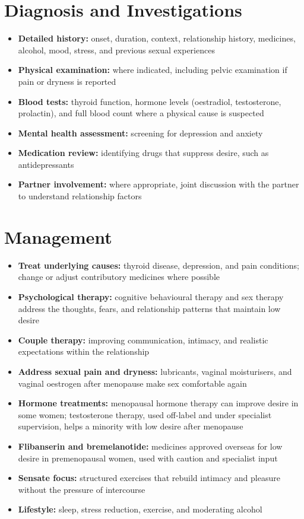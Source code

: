 \section*{Diagnosis and Investigations}
\begin{itemize}
    \item \textbf{Detailed history:} onset, duration, context, relationship history, medicines, alcohol, mood, stress, and previous sexual experiences
    \item \textbf{Physical examination:} where indicated, including pelvic examination if pain or dryness is reported
    \item \textbf{Blood tests:} thyroid function, hormone levels (oestradiol, testosterone, prolactin), and full blood count where a physical cause is suspected
    \item \textbf{Mental health assessment:} screening for depression and anxiety
    \item \textbf{Medication review:} identifying drugs that suppress desire, such as antidepressants
    \item \textbf{Partner involvement:} where appropriate, joint discussion with the partner to understand relationship factors
\end{itemize}

\section*{Management}
\begin{itemize}
    \item \textbf{Treat underlying causes:} thyroid disease, depression, and pain conditions; change or adjust contributory medicines where possible
    \item \textbf{Psychological therapy:} cognitive behavioural therapy and sex therapy address the thoughts, fears, and relationship patterns that maintain low desire
    \item \textbf{Couple therapy:} improving communication, intimacy, and realistic expectations within the relationship
    \item \textbf{Address sexual pain and dryness:} lubricants, vaginal moisturisers, and vaginal oestrogen after menopause make sex comfortable again
    \item \textbf{Hormone treatments:} menopausal hormone therapy can improve desire in some women; testosterone therapy, used off-label and under specialist supervision, helps a minority with low desire after menopause
    \item \textbf{Flibanserin and bremelanotide:} medicines approved overseas for low desire in premenopausal women, used with caution and specialist input
    \item \textbf{Sensate focus:} structured exercises that rebuild intimacy and pleasure without the pressure of intercourse
    \item \textbf{Lifestyle:} sleep, stress reduction, exercise, and moderating alcohol
\end{itemize}

